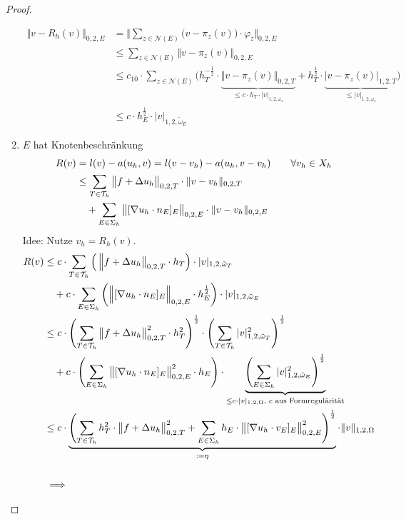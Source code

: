 \begin{proof}
\begin{enumerate}[label=\roman*)]
\begin{align*}
			\big\Vert v-R_h(v)\big\Vert_{0,2,E}
			&=\Bigg\Vert\sum\limits_{z\in\mathcal{N}(E)}\big(v-\pi_z(v)\big)\cdot\varphi_z\Bigg\Vert_{0,2,E}\\
			&\leq
			\sum\limits_{z\in\mathcal{N}(E)}\big\Vert v-\pi_z(v)\big\Vert_{0,2,E}\\
			&\leq
			c_{10}\cdot\sum\limits_{z\in\mathcal{N}(E)}\Big(h_T^{-\frac{1}{2}}\cdot\underbrace{\big\Vert v-\pi_z(v)\big\Vert_{0,2,T}}_{\leq c\cdot h_T\cdot|v|_{1,2,\omega_z}}+h_T^{\frac{1}{2}}\cdot\underbrace{\big|v-\pi_z(v)\big|_{1,2,T}}_{\leq|v|_{1,2,\omega_z}}\Big)\\
			&\leq
			c\cdot h_E^{\frac{1}{2}}\cdot|v|_{1,2,\tilde{\omega}_E}
		\end{align*}
		\item $E$ hat Knotenbeschränkung
		\begin{align*}
			R(v)&=l(v)-a(u_h,v)=l(v-v_h)-a(u_h,v-v_h)\qquad\forall v_h\in X_h\\
			&\leq\sum\limits_{T\in\mathcal{T}_h}\big\Vert f+\Delta u_h\big\Vert_{0,2,T}\cdot\Vert v-v_h\Vert_{0,2,T}\\
			&{}\quad+\sum\limits_{E\in\Sigma_h}\big\Vert[\nabla u_h\cdot n_E]_E\big\Vert_{0,2,E}\cdot\Vert v-v_h\Vert_{0,2,E}
		\end{align*}
		Idee: Nutze $v_h=R_h(v)$.
		\begin{align*}
			R(v)&\leq
			c\cdot\sum\limits_{T\in\T_h}\Big(\left\Vert f+ \Delta u_h\big\Vert_{0,2,T}\cdot h_T\right)\cdot |v|_{1,2,\tilde{\omega}_T}\\
			&\quad+c\cdot\sum\limits_{E\in\Sigma_h}\left(\Big\Vert[\nabla u_h\cdot n_E]_E\Big\Vert_{0,2,E}\cdot h_E^{\frac{1}{2}}\right)\cdot|v|_{1,2,\tilde{\omega}_E}\\
			&\leq
			c\cdot\left(\sum\limits_{T\in\T_h}\big\Vert f+\Delta u_h\big\Vert^2_{0,2,T}\cdot h_T^2\right)^{\frac{1}{2}}\cdot\left(\sum\limits_{T\in\T_h}|v|^2_{1,2,\tilde{\omega}_T}\right)^{\frac{1}{2}}\\
			&\quad+c\cdot\left(\sum\limits_{E\in\Sigma_h}\big\Vert[\nabla u_h\cdot n_E]_E\big\Vert^2_{0,2,E}\cdot h_E\right)\cdot\underbrace{\left(\sum\limits_{E\in\Sigma_h}|v|^2_{1,2,\tilde{\omega}_E}\right)^{\frac{1}{2}}}_{\leq c\cdot |v|_{1,2,\Omega}\text{, $c$ aus Formregulärität}}\\
			&\leq
			c\cdot\underbrace{\left(\sum\limits_{T\in\T_h} h^2_T\cdot\big\Vert f+\Delta u_h\big\Vert^2_{0,2,T}
			+\sum\limits_{E\in\Sigma_h}h_E\cdot\big\Vert[\nabla u_h\cdot v_E]_E\big\Vert^2_{0,2,E}\right)^{\frac{1}{2}}}_{:=\eta}\cdot\Vert v\Vert_{1,2,\Omega}\nl
			&\implies

\end{align*}
\end{enumerate}
\end{proof}

